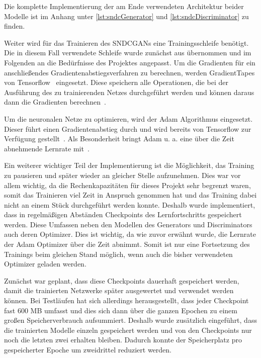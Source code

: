  Die komplette Implementierung der am Ende verwendeten Architektur beider Modelle ist im Anhang unter \autoref{lst:sndcGenerator} und \ref{lst:sndcDiscriminator} zu finden.
 
 Weiter wird für das Trainieren des SNDCGANs eine Trainingsschleife benötigt. Die in diesem Fall verwendete Schleife wurde zunächst aus \cite{raschka2019} übernommen und im Folgenden an die Bedürfnisse des Projektes angepasst. Um die Gradienten für ein anschließendes Gradientenabstiegsverfahren zu berechnen, werden GradientTapes von Tensorflow~\cite{tf:gradientape} eingesetzt. Diese speichern alle Operationen, die bei der Ausführung des zu trainierenden Netzes durchgeführt werden und können daraus dann die Gradienten berechnen~\cite{tf:autodiff}.
 
 Um die neuronalen Netze zu optimieren, wird der Adam Algorithmus eingesetzt. Dieser führt einen Gradientenabstieg durch und wird bereits von Tensorflow zur Verfügung gestellt~\cite{tf:adam}. Als Besonderheit bringt Adam u. a. eine über die Zeit abnehmende Lernrate mit~\cite{kingma2014}.
 
 Ein weiterer wichtiger Teil der Implementierung ist die Möglichkeit, das Training zu pausieren und später wieder an gleicher Stelle aufzunehmen. Dies war vor allem wichtig, da die Rechenkapazitäten für dieses Projekt sehr begrenzt waren, somit das Trainieren viel Zeit in Anspruch genommen hat und das Training dabei nicht an einem Stück durchgeführt werden konnte. Deshalb wurde implementiert, dass in regelmäßigen Abständen Checkpoints des Lernfortschritts gespeichert werden. Diese Umfassen neben den Modellen des Generators und Discriminators auch deren Optimizer. Dies ist wichtig, da wie zuvor erwähnt wurde, die Lernrate der Adam Optimizer über die Zeit abnimmt. Somit ist nur eine Fortsetzung des Trainings beim gleichen Stand möglich, wenn auch die bisher verwendeten Optimizer geladen werden. 
 
 Zunächst war geplant, dass diese Checkpoints dauerhaft gespeichert werden, damit die trainierten Netzwerke später ausgewertet und verwendet werden können. Bei Testläufen hat sich allerdings herausgestellt, dass jeder Checkpoint fast 600 MB umfasst und dies sich dann über die ganzen Epochen zu einem großen Speicherverbrauch aufsummiert. Deshalb wurde zusätzlich eingeführt, dass die trainierten Modelle einzeln gespeichert werden und von den Checkpoints nur noch die letzten zwei erhalten bleiben. Dadurch konnte der Speicherplatz pro gespeicherter Epoche um zweidrittel reduziert werden.
 
